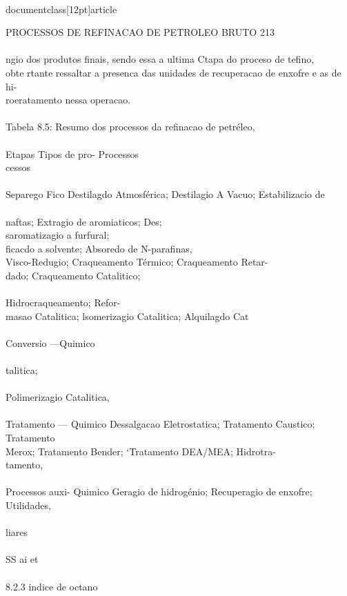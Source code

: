 \\documentclass[12pt]{article}
\begin{document}
PROCESSOS DE REFINACAO DE PETROLEO BRUTO 213\\
\\
ngio dos produtos finais, sendo essa a ultima Ctapa do proceso de tefino,\\
obte rtante ressaltar a presenca das unidades de recuperacao de enxofre e as de hi-\\
roeratamento nessa operacao.\\
\\
Tabela 8.5: Resumo dos processos da refinacao de petréleo,\\
\\
Etapas Tipos de pro- Processos\\
cessos\\
\\
Separego Fico Destilagdo Atmosférica; Destilagio A Vacuo; Estabilizacio de\\
\\
naftas; Extragio de aromiaticos; Des;\\
saromatizagio a furfural;\\
ficacdo a solvente; Absoredo de N-parafinas,\\
Visco-Redugio; Craqueamento Térmico; Craqueamento Retar-\\
dado; Craqueamento Catalitico;\\
\\
Hidrocraqueamento; Refor-\\
masao Catalitica; lsomerizagio Catalitica; Alquilagdo Cat\\
\\
Conversio —Quimico\\
\\
talitica;\\
\\
Polimerizagio Catalitica,\\
\\
Tratamento — Quimico Dessalgacao Eletrostatica; Tratamento Caustico; Tratamento\\
Merox; Tratamento Bender; ‘Tratamento DEA/MEA; Hidrotra-\\
tamento,\\
\\
Processos auxi- Quimico Geragio de hidrogénio; Recuperagio de enxofre; Utilidades,\\
\\
liares\\
\\
SS ai et\\
\\
8.2.3 indice de octano\\
\end{document}
